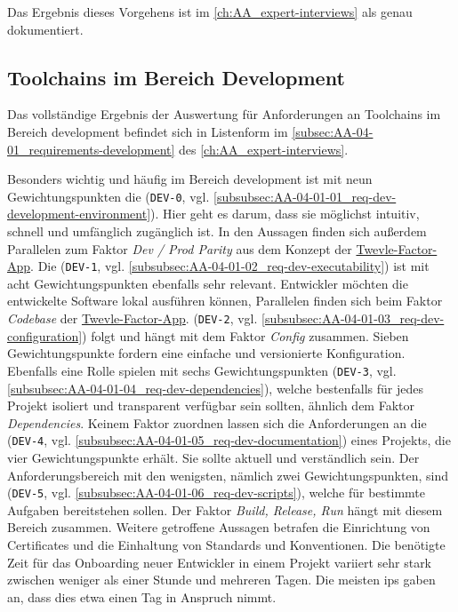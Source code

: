 Das Ergebnis dieses Vorgehens ist im \autoref{ch:AA_expert-interviews} als  genau dokumentiert.

\subsection{Toolchains im Bereich Development}
\label{subsec:04-02-02_toolchains-in-development}

Das vollständige Ergebnis der Auswertung für Anforderungen an Toolchains im Bereich \Gls{development} befindet sich in Listenform im \autoref{subsec:AA-04-01_requirements-development} des \autoref{ch:AA_expert-interviews}.

Besonders wichtig und häufig im Bereich \Gls{development} ist mit neun Gewichtungspunkten die \textbf{} (\texttt{DEV-0}, vgl. \autoref{subsubsec:AA-04-01-01_req-dev-development-environment}). Hier geht es darum, dass sie möglichst intuitiv, schnell und umfänglich zugänglich ist. In den Aussagen finden sich außerdem Parallelen zum Faktor \textit{Dev / Prod Parity} aus dem Konzept der \hyperref[sec:03-05_basic-idea-of-twelve-factor-app]{Twevle-Factor-App}. Die \textbf{} (\texttt{DEV-1}, vgl. \autoref{subsubsec:AA-04-01-02_req-dev-executability}) ist mit acht Gewichtungspunkten ebenfalls sehr relevant. Entwickler möchten die entwickelte Software lokal ausführen können, Parallelen finden sich beim Faktor \textit{Codebase} der \hyperref[sec:03-05_basic-idea-of-twelve-factor-app]{Twevle-Factor-App}. \textbf{} (\texttt{DEV-2}, vgl. \autoref{subsubsec:AA-04-01-03_req-dev-configuration}) folgt und hängt mit dem Faktor \textit{Config} zusammen. Sieben Gewichtungspunkte fordern eine einfache und versionierte Konfiguration. Ebenfalls eine Rolle spielen mit sechs Gewichtungspunkten \textbf{} (\texttt{DEV-3}, vgl. \autoref{subsubsec:AA-04-01-04_req-dev-dependencies}), welche bestenfalls für jedes Projekt isoliert und transparent verfügbar sein sollten, ähnlich dem Faktor \textit{Dependencies}. Keinem Faktor zuordnen lassen sich die Anforderungen an die \textbf{} (\texttt{DEV-4}, vgl. \autoref{subsubsec:AA-04-01-05_req-dev-documentation}) eines Projekts, die vier Gewichtungspunkte erhält. Sie sollte aktuell und verständlich sein. Der Anforderungsbereich mit den wenigsten, nämlich zwei Gewichtungspunkten, sind \textbf{} (\texttt{DEV-5}, vgl. \autoref{subsubsec:AA-04-01-06_req-dev-scripts}), welche für bestimmte Aufgaben bereitstehen sollen. Der Faktor \textit{Build, Release, Run} hängt mit diesem Bereich zusammen. Weitere getroffene Aussagen betrafen die Einrichtung von Certificates und die Einhaltung von Standards und Konventionen. Die benötigte Zeit für das Onboarding neuer Entwickler in einem Projekt variiert sehr stark zwischen weniger als einer Stunde und mehreren Tagen. Die meisten \Glspl{ip} gaben an, dass dies etwa einen Tag in Anspruch nimmt.

